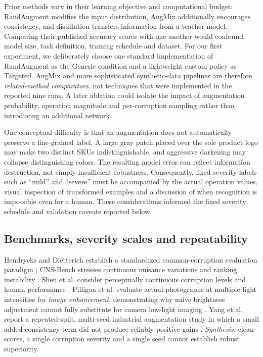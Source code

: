 \documentclass[sigconf,nonacm]{acmart}
\begin{document}
Prior methods vary in their learning objective and computational budget: RandAugment modifies the input distribution, AugMix additionally encourages consistency, and distillation transfers information from a teacher model. Comparing their published accuracy scores with one another would confound model size, task definition, training schedule and dataset. For our first experiment, we deliberately choose one standard implementation of RandAugment as the Generic condition and a lightweight custom policy as Targeted. AugMix and more sophisticated synthetic-data pipelines are therefore \emph{related-method comparators}, not techniques that were implemented in the reported nine runs. A later ablation could isolate the impact of augmentation probability, operation magnitude and per-corruption sampling rather than introducing an additional network.

One conceptual difficulty is that an augmentation does not automatically preserve a fine-grained label. A large gray patch placed over the sole product logo may make two distinct SKUs indistinguishable, and aggressive darkening may collapse distinguishing colors. The resulting model error can reflect information destruction, not simply insufficient robustness. Consequently, fixed severity labels such as ``mild'' and ``severe'' must be accompanied by the actual operation values, visual inspection of transformed examples and a discussion of when recognition is impossible even for a human. These considerations informed the fixed severity schedule and validation caveats reported below.

\subsection{Benchmarks, severity scales and repeatability}
Hendrycks and Dietterich establish a standardized common-corruption evaluation paradigm \cite{hendrycks2019benchmarking}; CNS-Bench stresses continuous nuisance variations and ranking instability \cite{dunkel2025cns}. Shen et al. consider perceptually continuous corruption levels and human performance \cite{shen2025vcr}. Pilligua et al. evaluate actual photographs at multiple light intensities for \emph{image enhancement}, demonstrating why naive brightness adjustment cannot fully substitute for camera low-light imaging \cite{pilligua2026mill}. Yang et al. report a repeated-split, multi-seed industrial augmentation study in which a small added consistency term did not produce reliably positive gains \cite{yang2026repro}. \emph{Synthesis:} clean scores, a single corruption severity and a single seed cannot establish robust superiority.
\end{document}
